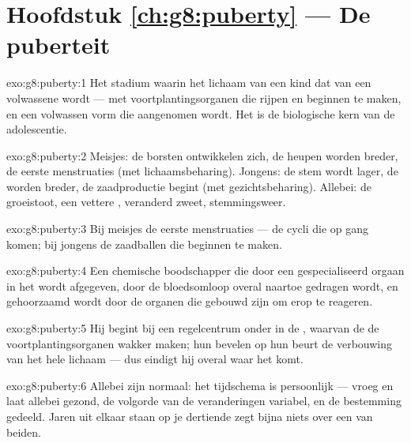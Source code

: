 \section*{Hoofdstuk \ref{ch:g8:puberty} --- De puberteit}

\begin{solution}{exo:g8:puberty:1}
Het stadium waarin het lichaam van een kind dat van een volwassene wordt
--- met voortplantingsorganen die rijpen en  beginnen te maken, en
een volwassen vorm die aangenomen wordt. Het is de biologische kern van de
adolescentie.
\end{solution}

\begin{solution}{exo:g8:puberty:2}
Meisjes: de borsten ontwikkelen zich, de heupen worden breder, de eerste
menstruaties (met lichaamsbeharing). Jongens: de stem wordt lager, de
 worden breder, de zaadproductie begint (met gezichtsbeharing).
Allebei: de groeistoot, een vettere , veranderd zweet, stemmingsweer.
\end{solution}

\begin{solution}{exo:g8:puberty:3}
Bij meisjes de eerste menstruaties --- de cycli die op gang komen; bij
jongens de zaadballen die  beginnen te maken.
\end{solution}

\begin{solution}{exo:g8:puberty:4}
Een chemische boodschapper die door een gespecialiseerd orgaan in het
 wordt afgegeven, door de bloedsomloop overal naartoe gedragen wordt,
en gehoorzaamd wordt door de organen die gebouwd zijn om erop te reageren.
\end{solution}

\begin{solution}{exo:g8:puberty:5}
Hij begint bij een regelcentrum onder in de , waarvan de 
de voortplantingsorganen wakker maken; hun  bevelen op hun beurt
de verbouwing van het hele lichaam --- dus eindigt hij overal waar het
 komt.
\end{solution}

\begin{solution}{exo:g8:puberty:6}
Allebei zijn normaal: het tijdschema is persoonlijk --- vroeg en laat
allebei gezond, de volgorde van de veranderingen variabel, en de bestemming
gedeeld. Jaren uit elkaar staan op je dertiende zegt bijna niets over een
van beiden.
\end{solution}

